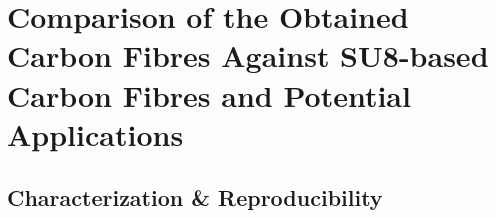 
\chapter{Comparison of the Obtained Carbon Fibres Against SU8-based Carbon Fibres and Potential Applications} %

\label{Chapter:5}

\section{Characterization \& Reproducibility}


